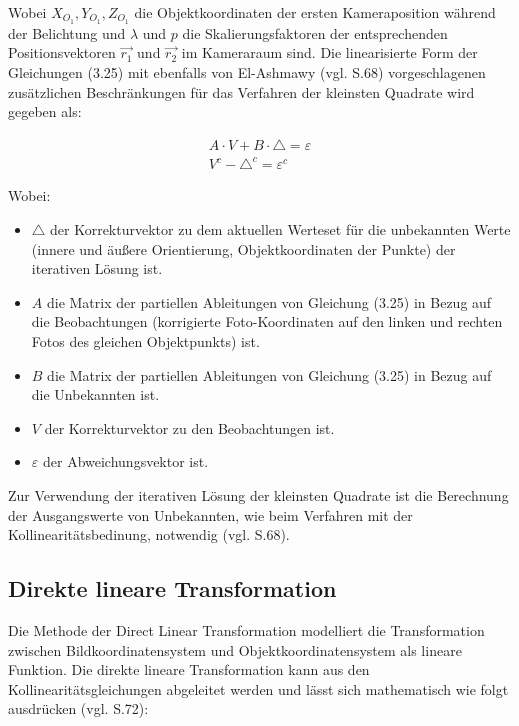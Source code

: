 Wobei $X_{O_1}, Y_{O_1},Z_{O_1}$ die Objektkoordinaten der ersten Kameraposition während der Belichtung und $\lambda$ und $p$ die Skalierungsfaktoren der entsprechenden Positionsvektoren $\vec{r_1}$ und $\vec{r_2}$ im Kameraraum sind. Die linearisierte Form der Gleichungen (3.25) mit ebenfalls von El-Ashmawy (vgl. \cite{comparative_conditions_study} S.68) vorgeschlagenen zusätzlichen Beschränkungen für das Verfahren der kleinsten Quadrate wird gegeben als:

\begin{equation}
\begin{aligned}
A\cdot V + B\cdot \triangle = \varepsilon \\
V^c - \triangle^c = \varepsilon^c
\end{aligned}
\end{equation}

Wobei:
\begin{itemize}
\item $\triangle$ der Korrekturvektor zu dem aktuellen Werteset für die unbekannten Werte (innere und äußere Orientierung, Objektkoordinaten der Punkte) der iterativen Lösung ist.

\item $A$ die Matrix der partiellen Ableitungen von Gleichung (3.25) in Bezug auf die Beobachtungen (korrigierte Foto-Koordinaten auf den linken und rechten Fotos des gleichen Objektpunkts) ist.

\item $B$ die Matrix der partiellen Ableitungen von Gleichung (3.25) in Bezug auf die Unbekannten  ist.

\item $V$ der Korrekturvektor zu den Beobachtungen ist.

\item $\varepsilon$ der Abweichungsvektor ist.
\end{itemize}

Zur Verwendung der iterativen Lösung der kleinsten Quadrate ist die Berechnung der Ausgangswerte von Unbekannten, wie beim Verfahren mit der Kollinearitätsbedinung, notwendig (vgl. \cite{comparative_conditions_study} S.68).


\subsection{Direkte lineare Transformation}

Die Methode der \glqq Direct Linear Transformation\grqq{} modelliert die Transformation zwischen Bildkoordinatensystem und Objektkoordinatensystem als lineare Funktion. Die direkte lineare Transformation kann aus den Kollinearitätsgleichungen abgeleitet werden und lässt sich mathematisch wie folgt ausdrücken (vgl. \cite{dlt} S.72):

